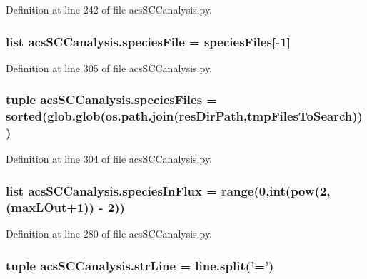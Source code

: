 Definition at line 242 of file acs\-S\-C\-Canalysis.\-py.

\hypertarget{a00102_a1d066fa24dced2da12ffd9a8514a17ba}{
\subsubsection[{species\-File}]{\setlength{\rightskip}{0pt plus 5cm}list acs\-S\-C\-Canalysis.\-species\-File = {\bf species\-Files}\mbox{[}-\/1\mbox{]}}}\label{a00102_a1d066fa24dced2da12ffd9a8514a17ba}


Definition at line 305 of file acs\-S\-C\-Canalysis.\-py.

\hypertarget{a00102_a4f47408478e9a0590d016df50cf42141}{
\subsubsection[{species\-Files}]{\setlength{\rightskip}{0pt plus 5cm}tuple acs\-S\-C\-Canalysis.\-species\-Files = sorted(glob.\-glob(os.\-path.\-join({\bf res\-Dir\-Path},{\bf tmp\-Files\-To\-Search})))}}\label{a00102_a4f47408478e9a0590d016df50cf42141}


Definition at line 304 of file acs\-S\-C\-Canalysis.\-py.

\hypertarget{a00102_a36f6b63269e716f42cd38a36a781a4cf}{
\subsubsection[{species\-In\-Flux}]{\setlength{\rightskip}{0pt plus 5cm}list acs\-S\-C\-Canalysis.\-species\-In\-Flux = range(0,int(pow(2,({\bf max\-L\-Out}+1)) -\/ 2))}}\label{a00102_a36f6b63269e716f42cd38a36a781a4cf}


Definition at line 280 of file acs\-S\-C\-Canalysis.\-py.

\hypertarget{a00102_a072631e11db72789389935b0f9efff8d}{
\subsubsection[{str\-Line}]{\setlength{\rightskip}{0pt plus 5cm}tuple acs\-S\-C\-Canalysis.\-str\-Line = {\bf line.\-split}('=')}}\label{a00102_a072631e11db72789389935b0f9efff8d}


